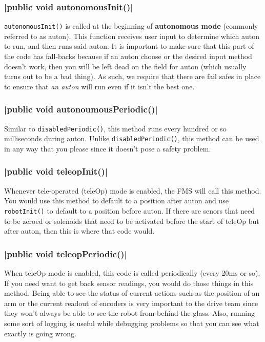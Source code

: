 \documentclass[11pt,fleqn]{article}
\begin{document}
\subsubsection{|public void autonomousInit()|}
\texttt{autonomousInit()} is called at the beginning of \textbf{autonomous mode} (commonly referred to
as auton). This function receives user input to determine which auton to run, and then runs said auton.
It is important to make sure that this part of the code has fall-backs because if an auton choose or the
desired input method doesn't work, then you will be left dead on the field for auton (which usually turns
out to be a bad thing). As such, we require that there are fail safes in place to ensure that \textit
{an auton} will run even if it isn't the best one.

\subsubsection{|public void autonoumousPeriodic()|}
Similar to \texttt{disabledPeriodic()}, this method runs every hundred or so milliseconds during auton.
Unlike \texttt{disabledPeriodic()}, this method can be used in any way that you please since it doesn't
pose a safety problem.

\subsubsection{|public void teleopInit()|}
Whenever tele-operated (teleOp) mode is enabled, the FMS will call this method. You would use this method
to default to a position after auton and use \texttt{robotInit()} to default to a position before auton.
If there are senors that need to be zeroed or solenoids that need to be activated before the start of
teleOp but after auton, then this is where that code would.

\subsubsection{|public void teleopPeriodic()|}
When teleOp mode is enabled, this code is called periodically (every 20ms or so). If you need want to
get back sensor readings, you would do those things in this method. Being able to see the status of current
actions such as the position of an arm or the current readout of encoders is very important to the drive
team since they won't always be able to see the robot from behind the glass. Also, running some sort of
logging is useful while debugging problems so that you can see what exactly is going wrong.
\end{document}
